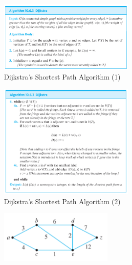 \documentclass{report}
\begin{document}
\begin{figure}[ht]
\centering
\includegraphics[width=0.6\textwidth]{ algo3.png }
\caption{Dijkstra's Shortest Path Algorithm (1)}
\end{figure}
\pagebreak
\begin{figure}[ht]
\centering
\includegraphics[width=0.6\textwidth]{ algo3.5.png}
\caption{Dijkstra's Shortest Path Algorithm (2)}
\end{figure}
\begin{figure}[ht]
\centering
\includegraphics[width=0.5\textwidth]{ graph20.png }
\end{figure}
\bigbreak \noindent
\end{document}
